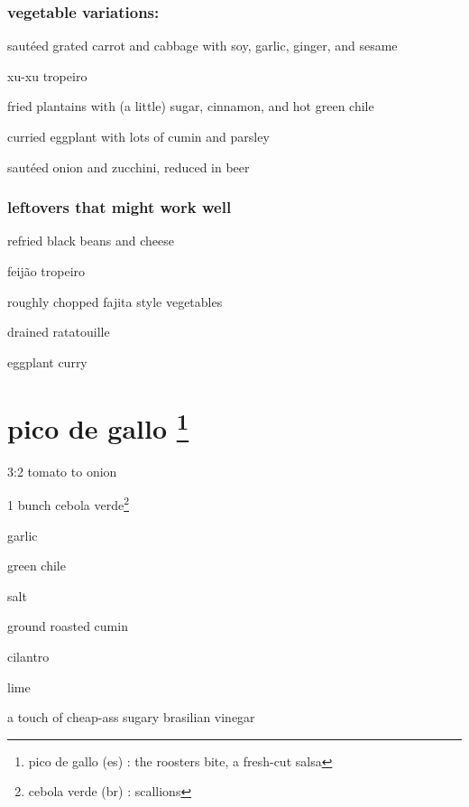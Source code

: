 \subsubsection{vegetable variations:}
\begin{ingredients}
  \item saut\'{e}ed grated carrot and cabbage with soy, garlic,
  ginger, and sesame
  \item xu-xu tropeiro
  \item fried plantains with (a little) sugar, cinnamon, and hot green
  chile
  \item curried eggplant with lots of cumin and parsley
  \item saut\'{e}ed onion and zucchini, reduced in beer
\end{ingredients}

\subsubsection{leftovers that might work well}
\begin{ingredients}
  \item refried black beans and cheese
  \item feij\~{a}o tropeiro
  \item roughly chopped fajita style vegetables
  \item drained ratatouille
  \item eggplant curry
\end{ingredients}

\section{pico de gallo
\footnote{pico de gallo (es) : the roosters bite, a fresh-cut salsa}}

\begin{ingredients}
  \item 3:2 tomato to onion
  \item 1 bunch cebola verde\footnote{cebola verde (br) : scallions}
  \item garlic
  \item green chile
  \item salt
  \item ground roasted cumin
  \item cilantro
  \item lime
  \item a touch of cheap-ass sugary brasilian vinegar
\end{ingredients}

